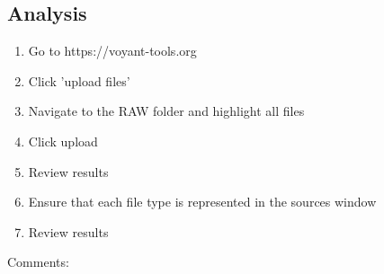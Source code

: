 \documentclass[11pt, a4paper,]{scrartcl}
\begin{document}
\subsection{Analysis}
\begin{enumerate}
    \item Go to https://voyant-tools.org
    \item Click 'upload files'
    \item Navigate to the RAW folder and highlight all files
    \item Click upload
    \item Review results
    \item Ensure that each file type is represented in the sources window
    \item Review results
\end{enumerate}
Comments:
\vspace{2cm}
\end{document}
